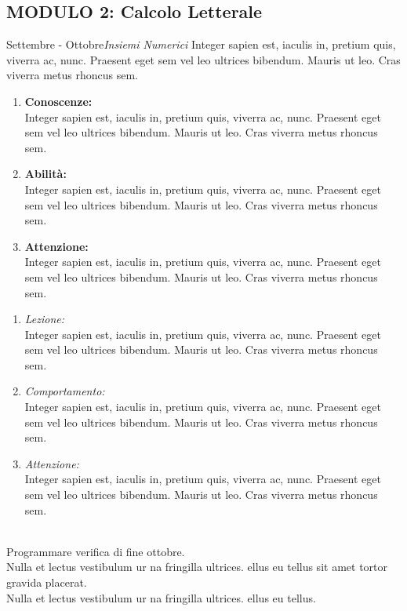 \documentclass[10pt, a4paper twoside, notitlepage, notoc, justified]{tufte-handout}
\begin{document}
\newpage
\subsection{\small \bf MODULO 2: Calcolo Letterale}

\begin{loggentry}{Settembre - Ottobre}{\em Insiemi Numerici}
Integer sapien est, iaculis in, pretium quis, viverra ac, nunc. Praesent eget sem vel leo ultrices bibendum. Mauris ut leo. Cras viverra metus rhoncus sem.

\begin{multicols}{2}
{\small
	\begin{enumerate}
		\item {\bf Conoscenze:}\\ Integer sapien est, iaculis in, pretium quis, viverra ac, nunc. Praesent eget sem vel leo ultrices bibendum. Mauris ut leo. Cras viverra metus rhoncus sem.
		\item {\bf Abilità:}\\ Integer sapien est, iaculis in, pretium quis, viverra ac, nunc. Praesent eget sem vel leo ultrices bibendum. Mauris ut leo. Cras viverra metus rhoncus sem.
		\item {\bf Attenzione:}\\ Integer sapien est, iaculis in, pretium quis, viverra ac, nunc. Praesent eget sem vel leo ultrices bibendum. Mauris ut leo. Cras viverra metus rhoncus sem.
	\end{enumerate} 
\columnbreak

\begin{enumerate}
		\item {\em Lezione:}\\ Integer sapien est, iaculis in, pretium quis, viverra ac, nunc. Praesent eget sem vel leo ultrices bibendum. Mauris ut leo. Cras viverra metus rhoncus sem.
		\item {\em Comportamento:}\\ Integer sapien est, iaculis in, pretium quis, viverra ac, nunc. Praesent eget sem vel leo ultrices bibendum. Mauris ut leo. Cras viverra metus rhoncus sem.
	\item {\em Attenzione:}\\ Integer sapien est, iaculis in, pretium quis, viverra ac, nunc. Praesent eget sem vel leo ultrices bibendum. Mauris ut leo. Cras viverra metus rhoncus sem.
	\end{enumerate}
	}
\end{multicols}
\\ Programmare verifica di fine ottobre. 
\\ Nulla et lectus vestibulum ur na fringilla ultrices. ellus eu tellus sit amet tortor gravida placerat. 
\\ Nulla et lectus vestibulum ur na fringilla ultrices. ellus eu tellus.
\end{loggentry}
\end{document}
